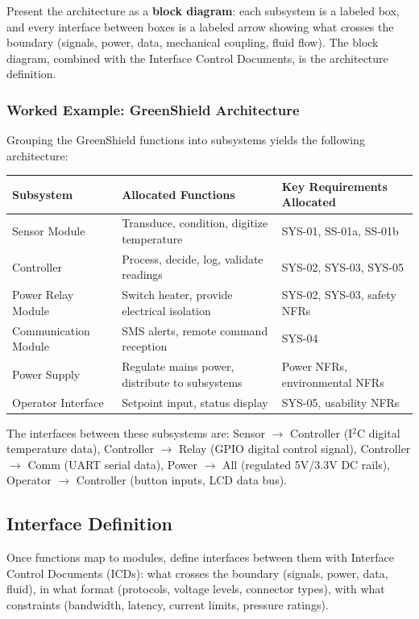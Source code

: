 \documentclass[11pt,letterpaper,twoside,openany]{book}
\begin{document}
Present the architecture as a \textbf{block diagram}: each subsystem is a labeled box, and every interface between boxes is a labeled arrow showing what crosses the boundary (signals, power, data, mechanical coupling, fluid flow). The block diagram, combined with the Interface Control Documents, is the architecture definition.

\subsubsection{Worked Example: GreenShield Architecture}
Grouping the GreenShield functions into subsystems yields the following architecture:

\begin{center}
\small
\begin{tabularx}{\textwidth}{l X X}
\toprule
\textbf{Subsystem} & \textbf{Allocated Functions} & \textbf{Key Requirements Allocated} \\
\midrule
Sensor Module & Transduce, condition, digitize temperature & SYS-01, SS-01a, SS-01b \\
Controller & Process, decide, log, validate readings & SYS-02, SYS-03, SYS-05 \\
Power Relay Module & Switch heater, provide electrical isolation & SYS-02, SYS-03, safety NFRs \\
Communication Module & SMS alerts, remote command reception & SYS-04 \\
Power Supply & Regulate mains power, distribute to subsystems & Power NFRs, environmental NFRs \\
Operator Interface & Setpoint input, status display & SYS-05, usability NFRs \\
\bottomrule
\end{tabularx}
\end{center}

The interfaces between these subsystems are: Sensor $\to$ Controller (I$^2$C digital temperature data), Controller $\to$ Relay (GPIO digital control signal), Controller $\to$ Comm (UART serial data), Power $\to$ All (regulated 5V/3.3V DC rails), Operator $\to$ Controller (button inputs, LCD data bus).

\subsection{Interface Definition}
Once functions map to modules, define interfaces between them with Interface Control Documents (ICDs): what crosses the boundary (signals, power, data, fluid), in what format (protocols, voltage levels, connector types), with what constraints (bandwidth, latency, current limits, pressure ratings).
\end{document}

